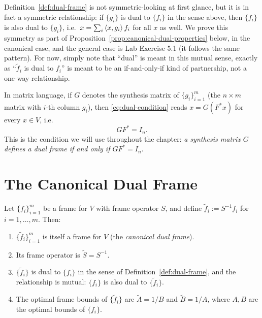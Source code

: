 \begin{remark*}
Definition~\ref{def:dual-frame} is not symmetric-looking at first
glance, but it is in fact a symmetric relationship: if $\{g_i\}$ is dual
to $\{f_i\}$ in the sense above, then $\{f_i\}$ is also dual to
$\{g_i\}$, i.e.\ $x=\sum_i\left\langle x, g_i \right\rangle f_i$ for all $x$ as well. We
prove this symmetry as part of Proposition~\ref{prop:canonical-dual-properties}
below, in the canonical case, and the general case is
Lab Exercise 5.1 (it follows the same pattern).
For now, simply note that ``dual'' is meant in this mutual sense, exactly
as ``$\tilde f_i$ is dual to $f_i$'' is meant to be an if-and-only-if kind
of partnership, not a one-way relationship.
\end{remark*}

In matrix language, if $G$ denotes the synthesis matrix of $\{g_i\}_{i=1}^m$
(the $n\times m$ matrix with $i$-th column $g_i$), then
\eqref{eq:dual-condition} reads $x = G(F^*x)$ for every $x\in V$, i.e.
\begin{equation}
\label{eq:dual-matrix-condition}
  GF^* = I_n.
\end{equation}
This is the condition we will use throughout the chapter: \emph{a
synthesis matrix $G$ defines a dual frame if and only if $GF^*=I_n$}.

\section{The Canonical Dual Frame}
\label{sec:canonical-dual}

\begin{proposition}
\label{prop:canonical-dual-properties}
Let $\{f_i\}_{i=1}^m$ be a frame for $V$ with frame operator $S$, and
define $\tilde f_i := S^{-1}f_i$ for $i=1,\ldots,m$. Then:
\begin{enumerate}[label=(\roman*)]
  \item $\{\tilde f_i\}_{i=1}^m$ is itself a frame for $V$ (the
        \emph{canonical dual frame}).
  \item Its frame operator is $\tilde S = S^{-1}$.
  \item $\{\tilde f_i\}$ is dual to $\{f_i\}$ in the sense of
        Definition~\ref{def:dual-frame}, and the relationship is
        mutual: $\{f_i\}$ is also dual to $\{\tilde f_i\}$.
  \item The optimal frame bounds of $\{\tilde f_i\}$ are
        $\tilde A = 1/B$ and $\tilde B = 1/A$, where $A,B$ are the
        optimal bounds of $\{f_i\}$.
\end{enumerate}
\end{proposition}

